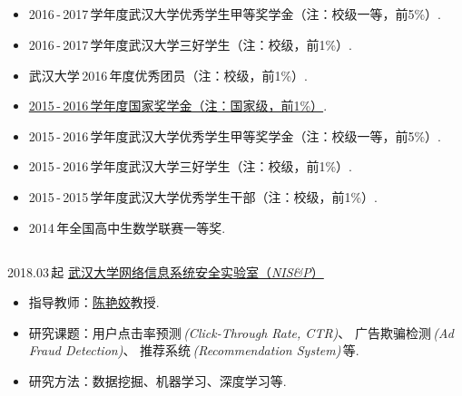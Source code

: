 \documentclass[letterpaper,AutoFakeBold]{twentysecondcv} %
\begin{document}
\begin{CJK*}{UTF8}{gbsn}


\begin{CJK*}{UTF8}{gkai}
\section{}
\end{CJK*}

\begin{itemize}
	\setlength{\itemsep}{0pt}
	\setlength{\parsep}{0pt}
	\setlength{\parskip}{0pt}
	\item 2016\,-\,2017\,学年度武汉大学优秀学生甲等奖学金（注：校级一等，前5\%）.
	\item 2016\,-\,2017\,学年度武汉大学三好学生（注：校级，前1\%）.
	\item 武汉大学\,2016\,年度优秀团员（注：校级，前1\%）.
	\item \href{https://raw.githubusercontent.com/RMSnow/CV/master/materials/NationalScholarship.jpg}
	{2015\,-\,2016\,学年度国家奖学金（注：国家级，前1\%）}.
	\item 2015\,-\,2016\,学年度武汉大学优秀学生甲等奖学金（注：校级一等，前5\%）.
	\item 2015\,-\,2016\,学年度武汉大学三好学生（注：校级，前1\%）.
	\item 2015\,-\,2015\,学年度武汉大学优秀学生干部（注：校级，前1\%）.
	\item 2014\,年全国高中生数学联赛一等奖.
\end{itemize}


\begin{CJK*}{UTF8}{gkai}
\section{}
\end{CJK*}

2018.03\,起 \qquad \href{http://nisplab.whu.edu.cn/index.html}{武汉大学网络信息系统安全实验室（\emph{NIS\&P}）}
\begin{itemize}
	\item 指导教师：\href{http://iqua.ece.toronto.edu/ychen/}{陈艳姣}教授.
	\item 研究课题：用户点击率预测\,\emph{(Click-Through Rate, CTR)}、
	广告欺骗检测\,\emph{(Ad Fraud Detection)}、
	推荐系统\,\emph{(Recommendation System)}\,等.
	\item 研究方法：数据挖掘、机器学习、深度学习等.
\end{itemize}


\end{CJK*}
\end{document}
